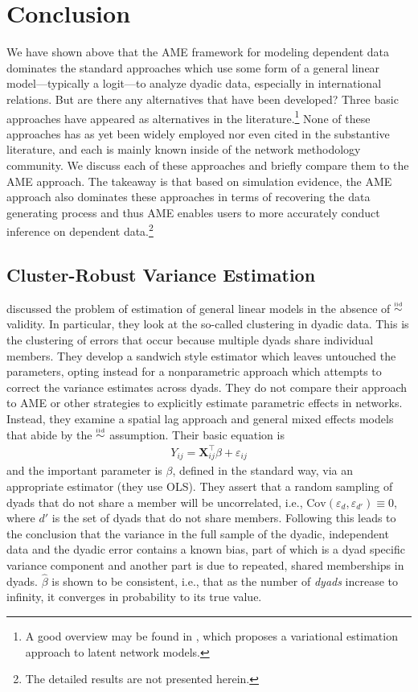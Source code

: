 \section{\textbf{Conclusion}}

We have shown above that the AME framework for modeling dependent data dominates the standard approaches which use some form of a general linear model---typically a logit---to analyze dyadic data, especially in international relations. But are there any alternatives that have been developed? Three basic approaches have appeared as alternatives in the literature.\footnote{A good overview may be found in \cite{stewart:2014}, which proposes a variational estimation approach to latent network models.}
None of these approaches has as yet been widely employed nor even cited in the substantive literature, and each is mainly known inside of the network methodology community.  We discuss each of these approaches and briefly compare them to the AME approach. The takeaway is that based on simulation evidence, the AME approach also dominates these approaches in terms of recovering the data generating process and thus AME enables users to more accurately conduct inference on dependent data.\footnote{The detailed results are not presented herein.}


\subsection*{Cluster-Robust Variance Estimation}

\cite{aronow:etal:2015} discussed the problem of estimation of general linear models in the absence of $\simiid$ validity. In particular, they look at the so-called clustering in dyadic data. This is the clustering of errors that occur because multiple dyads share individual members. They develop a sandwich style estimator which leaves untouched the parameters, opting instead for a nonparametric approach which attempts to correct the variance estimates across dyads.  They do not compare their approach to AME or other strategies to explicitly estimate parametric effects in networks. Instead, they examine a spatial lag approach and general mixed effects models that abide by the $\simiid$ assumption.  Their basic equation is 
\begin{eqnarray*}
Y_{ij} = \mathbf{X}_{ij}^\intercal \beta + \varepsilon_{ij}
\end{eqnarray*}
and the important parameter is $\beta$, defined in the standard way, via an appropriate estimator (they use OLS).  They assert that a random sampling of dyads that do not share a member will be uncorrelated, i.e., $\text{Cov}(\varepsilon_d,\varepsilon_{d'}) \equiv 0$, where $d'$ is the set of dyads that do not share members. Following this leads to the conclusion that the variance in the full sample of the dyadic, independent data and the dyadic error contains a known bias, part of which is a dyad specific variance component and another part is due to repeated, shared memberships in dyads. $\hat{\beta}$ is shown to be consistent, i.e., that as the number of \emph{dyads} increase to infinity, it converges in probability to its true value. 

